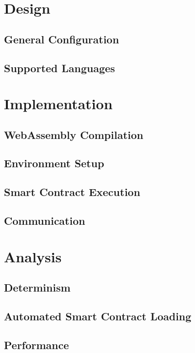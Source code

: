 \documentclass[11pt, a4paper, twoside, openright]{article}
\begin{document}
\section{Design}

\subsection{General Configuration}

\subsection{Supported Languages}


\section{Implementation}

\subsection{WebAssembly Compilation}

\subsection{Environment Setup}

\subsection{Smart Contract Execution}

\subsection{Communication}


\section{Analysis}

\subsection{Determinism}

\subsection{Automated Smart Contract Loading}

\subsection{Performance}
\end{document}
